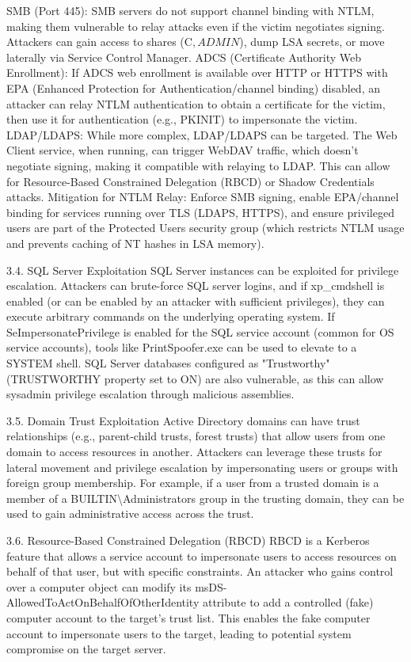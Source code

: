 SMB (Port 445): SMB servers do not support channel binding with NTLM, making them vulnerable to relay attacks even if the victim negotiates signing. Attackers can gain access to shares (C$, ADMIN$), dump LSA secrets, or move laterally via Service Control Manager.
ADCS (Certificate Authority Web Enrollment): If ADCS web enrollment is available over HTTP or HTTPS with EPA (Enhanced Protection for Authentication/channel binding) disabled, an attacker can relay NTLM authentication to obtain a certificate for the victim, then use it for authentication (e.g., PKINIT) to impersonate the victim.
LDAP/LDAPS: While more complex, LDAP/LDAPS can be targeted. The Web Client service, when running, can trigger WebDAV traffic, which doesn't negotiate signing, making it compatible with relaying to LDAP. This can allow for Resource-Based Constrained Delegation (RBCD) or Shadow Credentials attacks.
Mitigation for NTLM Relay: Enforce SMB signing, enable EPA/channel binding for services running over TLS (LDAPS, HTTPS), and ensure privileged users are part of the Protected Users security group (which restricts NTLM usage and prevents caching of NT hashes in LSA memory).

3.4. SQL Server Exploitation
SQL Server instances can be exploited for privilege escalation. Attackers can brute-force SQL server logins, and if xp\_cmdshell is enabled (or can be enabled by an attacker with sufficient privileges), they can execute arbitrary commands on the underlying operating system. If SeImpersonatePrivilege is enabled for the SQL service account (common for OS service accounts), tools like PrintSpoofer.exe can be used to elevate to a SYSTEM shell. SQL Server databases configured as "Trustworthy" (TRUSTWORTHY property set to ON) are also vulnerable, as this can allow sysadmin privilege escalation through malicious assemblies.

3.5. Domain Trust Exploitation
Active Directory domains can have trust relationships (e.g., parent-child trusts, forest trusts) that allow users from one domain to access resources in another. Attackers can leverage these trusts for lateral movement and privilege escalation by impersonating users or groups with foreign group membership. For example, if a user from a trusted domain is a member of a BUILTIN\textbackslash Administrators group in the trusting domain, they can be used to gain administrative access across the trust.

3.6. Resource-Based Constrained Delegation (RBCD)
RBCD is a Kerberos feature that allows a service account to impersonate users to access resources on behalf of that user, but with specific constraints. An attacker who gains control over a computer object can modify its msDS-AllowedToActOnBehalfOfOtherIdentity attribute to add a controlled (fake) computer account to the target's trust list. This enables the fake computer account to impersonate users to the target, leading to potential system compromise on the target server.


